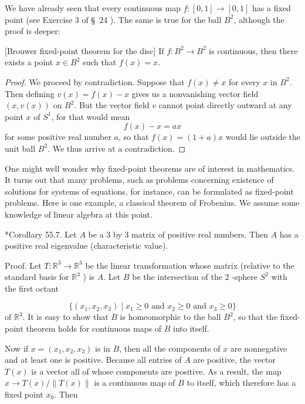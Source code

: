 We have already seen that every continuous map \(f : [ {0,1}] \rightarrow [ {0,1}]\) has a fixed point (see Exercise 3 of \S\ 24 ). The same is true for the ball \(B^{2}\), although the proof is deeper:
\begin{theorem}
\label{thm:\thetheorem}[Brouwer fixed-point theorem for the disc]
If \(f : B^{2} \rightarrow {B}^{2}\) is continuous, then there exists a point \(x \in {B}^{2}\) such that \(f(x) = x\).
\end{theorem}

\begin{proof}
We proceed by contradiction. Suppose that \(f(x) \neq x\) for every \(x\) in \(B^{2}\). Then defining \(v(x) = f(x) - x\) gives us a nonvanishing vector field \(( {x,v(x) })\) on \(B^{2}\). But the vector field \(v\) cannot point directly outward at any point \(x\) of \(S^{1}\), for that would mean
\[
f(x) - x = {ax}
\]
for some positive real number \(a\), so that \(f(x) = ( {1 + a}) x\) would lie outside the unit ball \(B^{2}\). We thus arrive at a contradiction.
\end{proof}

One might well wonder why fixed-point theorems are of interest in mathematics. It turns out that many problems, such as problems concerning existence of solutions for systems of equations, for instance, can be formulated as fixed-point problems. Here is one example, a classical theorem of Frobenius. We assume some knowledge of linear algebra at this point.

*Corollary 55.7. Let \(A\) be a 3 by 3 matrix of positive real numbers. Then \(A\) has a positive real eigenvalue (characteristic value).

Proof. Let \(T : \mathbb{R}^{3} \rightarrow {\mathbb{R}}^{3}\) be the linear transformation whose matrix (relative to the standard basis for \(\mathbb{R}^{3}\) ) is \(A\). Let \(B\) be the intersection of the 2 -sphere \(S^{2}\) with the first octant

\[
\{ {( {x_{1},x_{2},x_{3}}) \mid {x}_{1} \geq 0\text{ and }x_{2} \geq 0\text{ and }x_{3} \geq 0}\}
\]
of \(\mathbb{R}^{3}\). It is easy to show that \(B\) is homeomorphic to the ball \(B^{2}\), so that the fixed-point theorem holds for continuous maps of \(B\) into itself.

Now if \(x = ( {x_{1},x_{2},x_{3}})\) is in \(B\), then all the components of \(x\) are nonnegative and at least one is positive. Because all entries of \(A\) are positive, the vector \(T(x)\) is a vector all of whose components are positive. As a result, the map \(x \rightarrow T(x) /\parallel T(x) \parallel\) is a continuous map of \(B\) to itself, which therefore has a fixed point \(x_{0}\). Then

